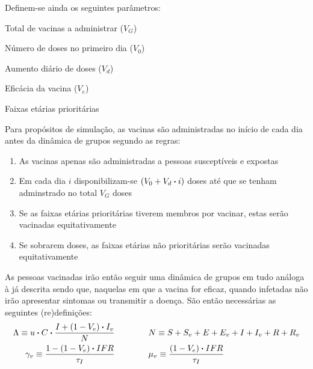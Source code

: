 Definem-se ainda os seguintes parâmetros:
\begin{itemize}\begin{multicols}{2}\raggedcolumns
        \item Total de vacinas a administrar ($V_G$)
        \item Número de doses no primeiro dia ($V_0$)
        \item Aumento diário de doses ($V_d$)
        \item Eficácia da vacina ($V_e$)
        \item Faixas etárias prioritárias
\end{multicols}\end{itemize}

Para propósitos de simulação, as vacinas são administradas no início de cada dia antes da dinâmica de grupos segundo as regras:
\begin{enumerate}
        \item As vacinas apenas são administradas a pessoas susceptíveis e expostas
        \item Em cada dia $i$ disponibilizam-se $(V_0+V_d\vdot i)$ doses até que se tenham adminstrado no total $V_G$ doses
        \item Se as faixas etárias prioritárias tiverem membros por vacinar, estas serão vacinadas equitativamente
        \item Se sobrarem doses, as faixas etárias não prioritárias serão vacinadas equitativamente
\end{enumerate}

As pessoas vacinadas irão então seguir uma dinâmica de grupos em tudo análoga à já descrita sendo que, naquelas em que a vacina for eficaz, quando infetadas não irão apresentar sintomas ou transmitir a doença.
São então necessárias as seguintes (re)definições:
\begin{align*}
        \Lambda \equiv u\vdot C\vdot \frac{I + (1-V_e)\vdot I_v}{N}
        \qquad&\qquad
        N \equiv S + S_v + E + E_v + I + I_v + R + R_v
        \\
        \gamma_v \equiv \frac{1-(1-V_e)\vdot IFR}{\tau_I}
        \qquad&\qquad
        \mu_v \equiv \frac{(1-V_e)\vdot IFR}{\tau_I}
\end{align*}

